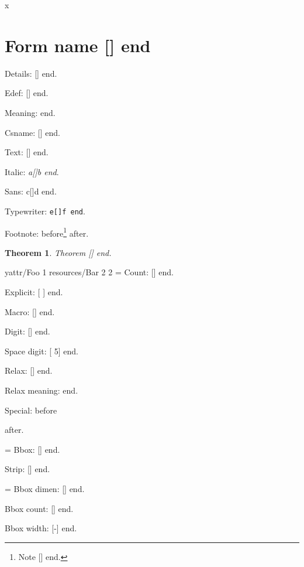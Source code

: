 \documentclass{article}
\newtheorem{theorem}{Theorem}
\def\formone{1}
\begin{document}
\tableofcontents

\hbox{x} \xdef\formname{\pdfxformname\pdflastxform}

\section{Form name [\pdfxformname\pdflastxform] end}

Details: [\formname] end.

\edef\formedef{\pdfxformname\pdflastxform}%
Edef: [\formedef] end.

\edef\formmeaning{\pdfxformname\pdflastxform}%
Meaning: \texttt{\meaning\formmeaning} end.

\expandafter\def\csname Fm\pdfxformname\pdflastxform{}%
Csname: [\csname Fm\pdfxformname\pdflastxform\endcsname] end.

Text: [\pdfxformname\pdflastxform] end.

Italic: \emph{a[\pdfxformname\pdflastxform]b end}.

Sans: \textsf{c[\pdfxformname\pdflastxform]d end}.

Typewriter: \texttt{e[\pdfxformname\pdflastxform]f end}.

Footnote: before\footnote{Note [\pdfxformname\pdflastxform] end.} after.

\begin{theorem}
Theorem [\pdfxformname\pdflastxform] end.
\end{theorem}

\hbox{y}\pdfxform attr{/Foo 1} resources{/Bar 2} 2
\formno=\pdflastxform
Count: [\pdfxformname\formno] end.

Explicit: [ ] end.

Macro: [\pdfxformname\formone] end.

Digit: [\pdfxformname{}] end.

Space digit: [ 5] end.

Relax: [\pdfxformname\pdflastxform\relax] end.

\edef\formrelax{[\pdfxformname\pdflastxform\relax]}%
Relax meaning: \texttt{\meaning\formrelax} end.

Special: before after.

\immediate{}\imgno=\pdflastximage
\xdef\bbox{\pdfximagebbox{}}%
Bbox: [\bbox] end.

\makeatletter
Strip: [\expandafter\rem@pt\bbox] end.
\makeatother

=\pdfximagebbox{}\relax
Bbox dimen: [\the{}] end.

Bbox count: [\pdfximagebbox{}] end.

Bbox width: [\the\dimexpr\pdfximagebbox{}-\pdfximagebbox{}\relax] end.
\end{document}
